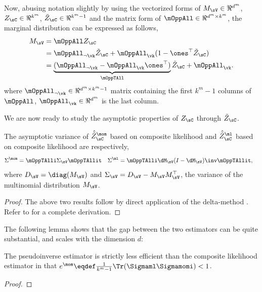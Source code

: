 Now, abusing notation slightly by using the vectorized forms of $M_\sV
\in \Re^{d^m}$, $Z_\sC \in \Re^{k^m}$, $\tilde Z_\sC \in \Re^{k^m-1}$
and the matrix form of $\mOppAll \in \Re^{d^m \times k^m}$, the marginal
distribution can be expressed as follows,
\begin{align*}
  M_\sV 
        &= \mOppAll Z_\sC \\
        &= \mOppAll_{\neg \vk} \tilde Z_\sC + \mOppAll_{\vk} (1 - \ones^\top \tilde Z_\sC) \\
        &= \underbrace{(\mOppAll_{\neg \vk} -  \mOppAll_{\vk}\ones^\top)}_{\mOppTAll} \tilde Z_\sC + \mOppAll_{\vk}.
\end{align*}
where $\mOppAll_{\neg \vk} \in \Re^{d^m \times k^m - 1}$ matrix containing the
first $k^m-1$ columns of $\mOppAll$, $\mOppAll_\vk \in \Re^{d^m}$ is the
last column. %

We are now ready to study the asymptotic properties of $Z_\sC$ through
$\tilde{Z}_\sC$.

\providecommand{\hatt}[1] {\hat{\tilde{#1}}}
\begin{lemma}
  \label{lem:mom-pw-variance}
  The asymptotic variance of $\hatt Z^\mom_{\sC}$ based on composite likelihood and 
  $\hatt Z^\ml_{\sC}$ based on composite likelihood are respectively,
  \begin{align*}
    \Sigma^{\mom} &= \mOppTAlli \Sigma_\sV \mOppTAllit
    &
    \Sigma^{\ml} &= \mOppTAlli \dM_\sV (I - \dM_\sV)\inv \mOppTAllit,
  \end{align*}
  where $D_\sV = \diag(M_\sV)$ and $\Sigma_\sV = D_\sV - M_\sV
  M_\sV^\top$, the variance of the multinomial distribution $M_\sV$.
\end{lemma}
\begin{proof}
  The above two results follow by direct application of the delta-method
  \cite{vaart98asymptotic}. Refer to  for
  a complete derivation.
\end{proof}


The following lemma shows that the gap between the two estimators can be quite substantial,
and scales with the dimension $d$: %
\begin{corollary}
The pseudoinverse estimator is strictly less efficient
than the composite likelihood estimator in that $e^\mom \eqdef \frac{1}{k^m-1} \Tr(\Sigmaml\Sigmamomi ) < 1$.
\end{corollary}
\begin{proof}
\end{proof}

